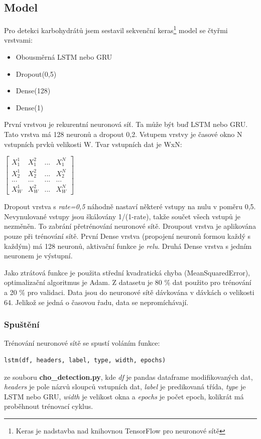 \subsection{Model}

Pro detekci karbohydrátů jsem sestavil sekvenční keras\footnote{Keras je nadstavba nad knihovnou TensorFlow pro neuronové sítě} model se čtyřmi vrstvami:
\begin{itemize}
\setlength\itemsep{0em}
\item Obousměrná LSTM nebo GRU
\item Dropout(0,5)
\item Dense(128)
\item Dense(1)
\end{itemize}

První vrstvou je rekurentní neuronová síť. Ta může být buď LSTM nebo GRU. Tato vrstva má 128 neuronů a dropout 0,2. Vstupem vrstvy je časové okno N vstupních prvků velikosti W. Tvar vstupních dat je WxN:

$\begin{bmatrix}
X^{1}_{1} & X^{2}_{1} & ... & X^{N}_{1}\\
X^{1}_{2} & X^{2}_{2} & ... & X^{N}_{2}\\
... & ... & ... & ...\\
X^{1}_{W} & X^{2}_{W} & ... & X^{N}_{W}
\end{bmatrix}$

Dropout vrstva s \textit{rate=0,5} náhodně nastaví některé vstupy na nulu v poměru 0,5. Nevynulované vstupy jsou škálovány 1/(1-rate), takže součet všech vstupů je nezměněn. To zabrání přetrénování neuronové sítě. Droupout vrstva je aplikována pouze při trénování sítě. První Dense vrstva (propojení neuronů formou každý s každým) má 128 neuronů, aktivační funkce je \textit{relu}. Druhá Dense vrstva s jedním neuronem je výstupní.

Jako ztrátová funkce je použita střední kvadratická chyba (MeanSquaredError), optimalizační algoritmus je Adam. Z datasetu je 80 \% dat použito pro trénování a 20 \% pro validaci. Data jsou do neuronové sítě dávkována v dávkách o velikosti 64. Jelikož se jedná o časovou řadu, data se nepromíchávají.

\subsubsection{Spuštění}

Trénování neuronové sítě se spustí voláním funkce:
\begin{verbatim}
lstm(df, headers, label, type, width, epochs)
\end{verbatim}
ze souboru \textbf{cho\_detection.py}, kde \textit{df} je pandas dataframe modifikovaných dat, \textit{headers} je pole názvů sloupců vstupních dat, \textit{label} je predikovaná třída, \textit{type} je LSTM nebo GRU, \textit{width} je velikost okna a \textit{epochs} je počet epoch, kolikrát má proběhnout trénovací cyklus.

